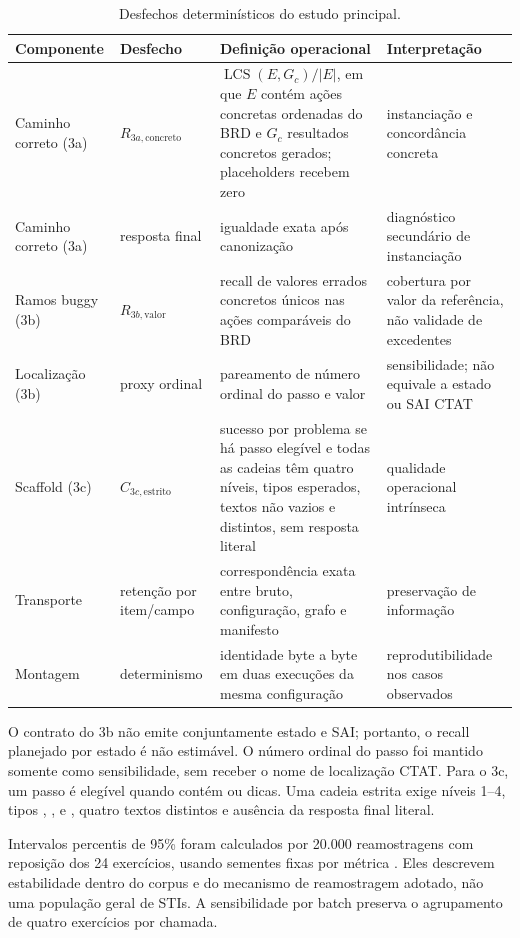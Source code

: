 \documentclass[11pt,a4paper]{article}
\newcommand{\Rthreea}{\ensuremath{R_{3a,\mathrm{concreto}}}}
\newcommand{\Rthreeb}{\ensuremath{R_{3b,\mathrm{valor}}}}
\newcommand{\Cthreec}{\ensuremath{C_{3c,\mathrm{estrito}}}}
\DeclareMathOperator{\LCS}{LCS}
\begin{document}
\begin{table}[H]
\centering
\caption{Desfechos determinísticos do estudo principal.}
\label{tab:estimandos}
\footnotesize
\setlength{\tabcolsep}{3pt}
\begin{tabularx}{\textwidth}{@{}P{2.25cm}P{2.6cm}Y Y@{}}
\toprule
Componente & Desfecho & Definição operacional & Interpretação \\
\midrule
Caminho correto (3a) & \Rthreea & $\LCS(E,G_c)/|E|$, em que $E$ contém ações concretas ordenadas do BRD e $G_c$ resultados concretos gerados; placeholders recebem zero & instanciação e concordância concreta \\
Caminho correto (3a) & resposta final & igualdade exata após canonização & diagnóstico secundário de instanciação \\
Ramos buggy (3b) & \Rthreeb & recall de valores errados concretos únicos nas ações comparáveis do BRD & cobertura por valor da referência, não validade de excedentes \\
Localização (3b) & proxy ordinal & pareamento de número ordinal do passo e valor & sensibilidade; não equivale a estado ou SAI CTAT \\
Scaffold (3c) & \Cthreec & sucesso por problema se há passo elegível e todas as cadeias têm quatro níveis, tipos esperados, textos não vazios e distintos, sem resposta literal & qualidade operacional intrínseca \\
Transporte & retenção por item/campo & correspondência exata entre bruto, configuração, grafo e manifesto & preservação de informação \\
Montagem & determinismo & identidade byte a byte em duas execuções da mesma configuração & reprodutibilidade nos casos observados \\
\bottomrule
\end{tabularx}
\end{table}

O contrato do 3b não emite conjuntamente estado e SAI; portanto, o recall planejado por estado é não estimável. O número ordinal do passo foi mantido somente como sensibilidade, sem receber o nome de localização CTAT. Para o 3c, um passo é elegível quando contém  ou dicas. Uma cadeia estrita exige níveis 1--4, tipos , ,  e , quatro textos distintos e ausência da resposta final literal.

Intervalos percentis de 95\% foram calculados por 20.000 reamostragens com reposição dos 24 exercícios, usando sementes fixas por métrica \citep{efron1993}. Eles descrevem estabilidade dentro do corpus e do mecanismo de reamostragem adotado, não uma população geral de STIs. A sensibilidade por batch preserva o agrupamento de quatro exercícios por chamada.
\end{document}
